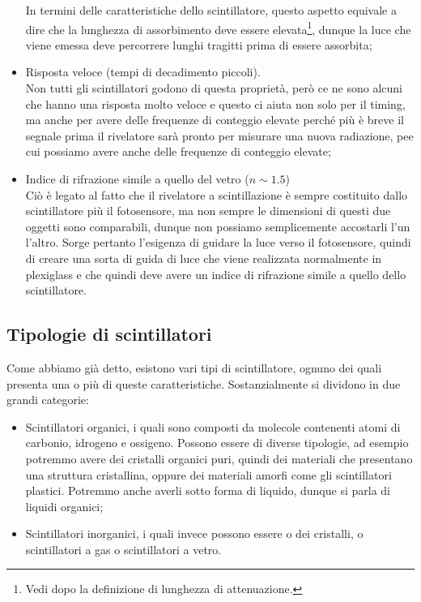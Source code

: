 \begin{itemize}[leftmargin=0.5cm]
   In termini delle caratteristiche dello scintillatore, questo aspetto equivale a dire che la lunghezza di assorbimento deve essere elevata\footnote{Vedi dopo la definizione di lunghezza di attenuazione.}, dunque la luce che viene emessa deve percorrere lunghi tragitti prima di essere assorbita;
   \item Risposta veloce (tempi di decadimento piccoli).\\
   Non tutti gli scintillatori godono di questa proprietà, però ce ne sono alcuni che hanno una risposta molto veloce e questo ci aiuta non solo per il timing, ma anche per avere delle frequenze di conteggio elevate perché più è breve il segnale prima il rivelatore sarà pronto per misurare una nuova radiazione, pee cui possiamo avere anche delle frequenze di conteggio elevate;
   \item Indice di rifrazione simile a quello del vetro ($n \sim 1.5$)\\
   Ciò è legato al fatto che il rivelatore a scintillazione è sempre costituito dallo scintillatore più il fotosensore, ma non sempre le dimensioni di questi due oggetti sono comparabili, dunque non possiamo semplicemente accostarli l'un l'altro. Sorge pertanto l'esigenza di guidare la luce verso il fotosensore, quindi di creare una sorta di guida di luce che viene realizzata normalmente in plexiglass e che quindi deve avere un indice di rifrazione simile a quello dello scintillatore.
\end{itemize}

\subsection{Tipologie di scintillatori}

Come abbiamo già detto, esistono vari tipi di scintillatore, ognuno dei quali presenta una o più di queste caratteristiche. Sostanzialmente si dividono in due grandi categorie:
\begin{itemize}[leftmargin=0.5cm]
   \item Scintillatori organici, i quali sono composti da molecole contenenti atomi di carbonio, idrogeno e ossigeno. Possono essere di diverse tipologie, ad esempio potremmo avere dei cristalli organici puri, quindi dei materiali che presentano una struttura cristallina, oppure dei materiali amorfi come gli scintillatori plastici. Potremmo anche averli sotto forma di liquido, dunque si parla di liquidi organici;
   \item Scintillatori inorganici, i quali invece possono essere o dei cristalli, o scintillatori a gas o scintillatori a vetro.
\end{itemize}

